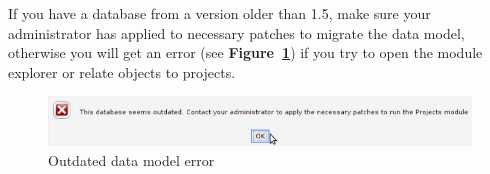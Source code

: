 \documentclass[a4paper]{article}
\begin{document}
		    If you have a database from a version older than 1.5, make sure your administrator has applied to necessary patches to migrate the data model, otherwise you will get an error (see \textbf{Figure~\ref{fig:projects_db_outdated}}) if you try to open the module explorer or relate objects to projects.		    
		    \newpage
		    \begin{figure}[h!]
		    	\centering
		    	\includegraphics[width=0.9\linewidth]{img/projects_db_outdated.png}
		    	\caption{Outdated data model error}
		    	\label{fig:projects_db_outdated}
		    \end{figure}
		    
\end{document}
